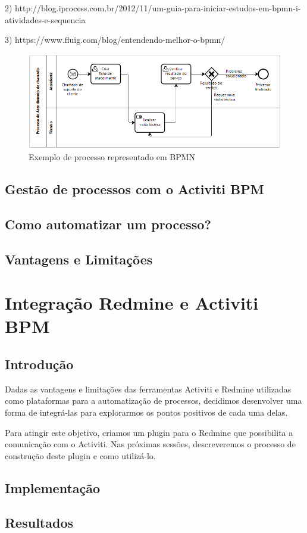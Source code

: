 2) http://blog.iprocess.com.br/2012/11/um-guia-para-iniciar-estudos-em-bpmn-i-atividades-e-sequencia

3) https://www.fluig.com/blog/entendendo-melhor-o-bpmn/

\begin{figure}
  \centering
  \includegraphics[width=1.0\textwidth]{imagens/bpmn_example.png}
  \caption{Exemplo de processo representado em BPMN}
  \label{fig:LABEL_FIG_1}
\end{figure}

\section{Gestão de processos com o Activiti BPM}\label{sec:LABEL_CHP_4_SEC_C}

\section{Como automatizar um processo?}\label{sec:LABEL_CHP_4_SEC_D}

\section{Vantagens e Limitações}\label{sec:LABEL_CHP_4_SEC_E}


\chapter{Integração Redmine e Activiti BPM}\label{chp:LABEL_CHP_5}

\section{Introdução}\label{sec:LABEL_CHP_5_SEC_A}
Dadas as vantagens e limitações das ferramentas Activiti e Redmine utilizadas como plataformas para a automatização de processos, decidimos desenvolver uma forma de integrá-las para explorarmos os pontos positivos de cada uma delas.

Para atingir este objetivo, criamos um plugin para o Redmine que possibilita a comunicação com o Activiti. Nas próximas sessões, descreveremos o processo de construção deste plugin e como utilizá-lo.


\section{Implementação}\label{sec:LABEL_CHP_5_SEC_A}

\section{Resultados}\label{sec:LABEL_CHP_5_SEC_A}